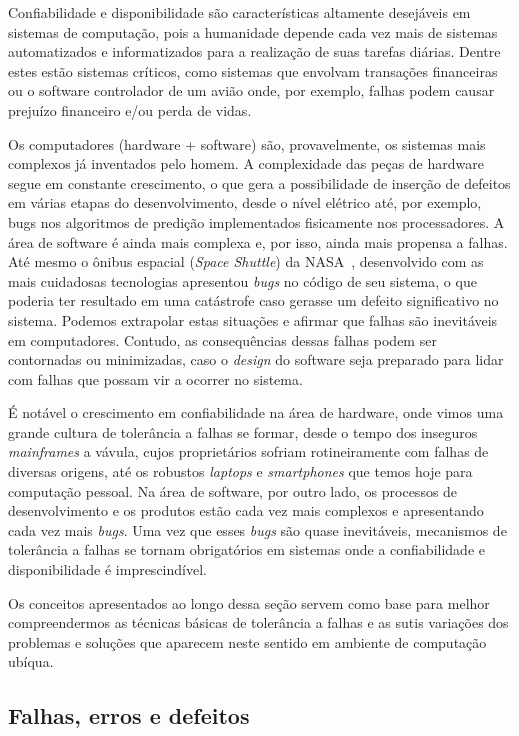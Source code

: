 Confiabilidade e disponibilidade são características altamente desejáveis em sistemas de computação, pois a humanidade depende cada vez mais de sistemas automatizados e informatizados para a realização de suas tarefas diárias. Dentre estes estão sistemas críticos, como sistemas que envolvam transações financeiras ou o software controlador de um avião onde, por exemplo, falhas podem causar prejuízo financeiro e/ou perda de vidas.

Os computadores (hardware + software) são, provavelmente, os sistemas mais complexos já inventados pelo homem. A complexidade das peças de hardware segue em constante crescimento, o que gera a possibilidade de inserção de defeitos em várias etapas do desenvolvimento, desde o nível elétrico até, por exemplo, bugs nos algoritmos de predição implementados fisicamente nos processadores. A área de software é ainda mais complexa e, por isso, ainda mais propensa a falhas. Até mesmo o ônibus espacial (\emph{Space Shuttle}) da NASA~\cite{BonacheaOnline}, desenvolvido com as mais cuidadosas tecnologias apresentou \emph{bugs} no código de seu sistema, o que poderia ter resultado em uma catástrofe caso gerasse um defeito significativo no sistema. Podemos extrapolar estas situações e afirmar que falhas são inevitáveis em computadores. Contudo, as consequências dessas falhas podem ser contornadas ou minimizadas, caso o \emph{design} do software seja preparado para lidar com falhas que possam vir a ocorrer no sistema.

É notável o crescimento em confiabilidade na área de hardware, onde vimos uma grande cultura de tolerância a falhas se formar, desde o tempo dos inseguros \emph{mainframes} a vávula, cujos proprietários sofriam rotineiramente com falhas de diversas origens, até os robustos \emph{laptops} e \emph{smartphones} que temos hoje para computação pessoal. Na área de software, por outro lado, os processos de desenvolvimento e os produtos estão cada vez mais complexos e apresentando cada vez mais \emph{bugs}. Uma vez que esses \emph{bugs} são quase inevitáveis, mecanismos de tolerância a falhas se tornam obrigatórios em sistemas onde a confiabilidade e disponibilidade é imprescindível.

Os conceitos apresentados ao longo dessa seção servem como base para melhor compreendermos as técnicas básicas de tolerância a falhas e as sutis variações dos problemas e soluções que aparecem neste sentido em ambiente de computação ubíqua.

\subsection{Falhas, erros e defeitos} %
\label{sub:falhas_erros_e_defeitos}

